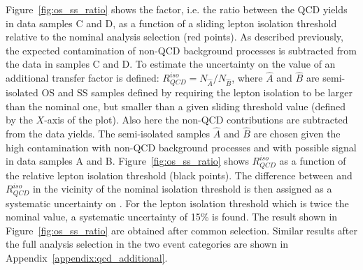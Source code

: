 Figure~\ref{fig:os_ss_ratio} shows the \rqcd factor, i.e. the ratio between the QCD 
yields in data samples C and D, as a function of a sliding lepton isolation threshold relative to the 
nominal analysis selection (red points).
As described previously, the expected contamination of  non-QCD background processes is subtracted from the data in samples C and D.
To estimate the uncertainty on the value of \rqcd  an additional transfer factor is defined: $R_{QCD}^{iso}  = N_{\hat{A}} / N_{\hat{B}}$,
where  $\hat{A}$ and $\hat{B}$  are semi-isolated OS and SS samples defined by requiring the lepton isolation to be  larger 
than the nominal one, 
but smaller than a given sliding threshold value (defined by the $X$-axis of the plot). Also here the non-QCD contributions are subtracted from the data yields.
The semi-isolated samples $\hat{A}$ and $\hat{B}$ are chosen  
given the high contamination with non-QCD background processes and with possible signal in data samples A and B. 
Figure~\ref{fig:os_ss_ratio} shows $R_{QCD}^{iso}$ as a function of the relative lepton isolation threshold (black points).
The difference between \rqcd and $R_{QCD}^{iso} $ in the vicinity of the nominal isolation threshold
is then assigned as a systematic uncertainty on \rqcd. For the lepton isolation threshold which is 
twice the nominal value, a systematic uncertainty of 15\% is found.
The result shown  in Figure~\ref{fig:os_ss_ratio} are obtained  after common selection. Similar results after the full analysis selection
in the two event categories are shown in Appendix~\ref{appendix:qcd_additional}.


